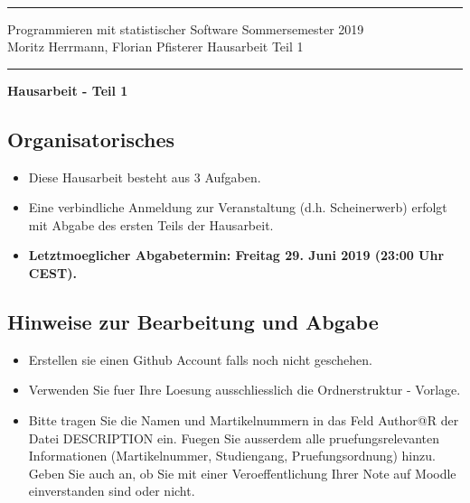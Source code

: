 \documentclass[a4paper]{article}
\begin{document}
  \sloppy \thispagestyle{empty} \setlength{\parindent}{0cm}
  \rule{0cm}{0cm}
  \vspace{-3.8cm}\\

  {\hrule \vspace{.2cm} {\sfbold Programmieren mit statistischer Software}\hfill
    {\sfbold Sommersemester 2019}\\
    {\sfbold Moritz Herrmann, Florian Pfisterer}\hfill {\sfbold
      Hausarbeit Teil 1}


    \vspace{.2cm} \hrule \vspace{1.5cm}

    \begin{center}
      {\bf \LARGE Hausarbeit - Teil 1}
    \end{center}

    \subsection*{Organisatorisches}
    \begin{itemize}
      \item Diese Hausarbeit besteht aus {3 Aufgaben}.
      \item Eine verbindliche Anmeldung zur Veranstaltung (d.h. Scheinerwerb) erfolgt mit Abgabe des ersten Teils der Hausarbeit.
      \item {\bf Letztmoeglicher Abgabetermin: Freitag 29. Juni 2019 (23:00 Uhr CEST).}\\
    \end{itemize}

    \subsection*{Hinweise zur Bearbeitung und Abgabe}

    \begin{itemize}

      \item Erstellen sie einen Github Account falls noch nicht geschehen.

      \item Verwenden Sie fuer Ihre Loesung ausschliesslich die Ordnerstruktur - Vorlage.


      \item Bitte tragen Sie die Namen und Martikelnummern in das Feld Author@R der Datei DESCRIPTION ein.
       Fuegen Sie ausserdem alle pruefungsrelevanten Informationen (Martikelnummer, Studiengang, Pruefungsordnung) hinzu.
       Geben Sie auch an, ob Sie mit einer Veroeffentlichung Ihrer Note auf Moodle einverstanden sind oder nicht.


\end{itemize}}
\end{document}
